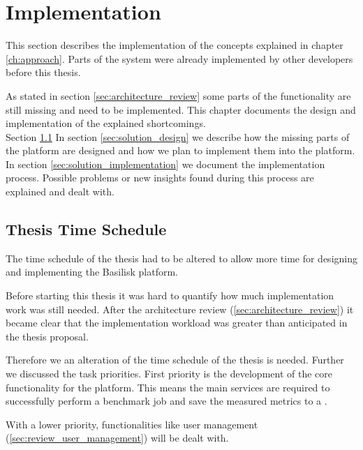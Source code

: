 \chapter{Implementation}
\label{ch:implementation}



This section describes the implementation of the concepts explained in chapter \ref{ch:approach}.
Parts of the system were already implemented by other developers before this thesis.

As stated in section \ref{sec:architecture_review} some parts of the functionality are still missing and need to be implemented.
This chapter documents the design and implementation of the explained shortcomings.
\\

Section \ref{sec:time_schedule}
In section \ref{sec:solution_design} we describe how the missing parts of the platform are designed and how we plan to implement them into the platform.
In section \ref{sec:solution_implementation} we document the implementation process.
Possible problems or new insights found during this process are explained and dealt with.






\section{Thesis Time Schedule}
\label{sec:time_schedule}
The time schedule of the thesis had to be altered to allow more time for designing and implementing the Basilisk platform.

Before starting this thesis it was hard to quantify how much implementation work was still needed.
After the architecture review (\ref{sec:architecture_review}) it became clear that the implementation workload was greater than anticipated in the thesis proposal.

Therefore we an alteration of the time schedule of the thesis is needed.
Further we discussed the task priorities.
First priority is the development of the core functionality for the platform.
This means the main services are required to successfully perform a benchmark job and save the measured metrics to a \ts{}.

With a lower priority, functionalities like user management (\ref{sec:review_user_management}) will be dealt with.

